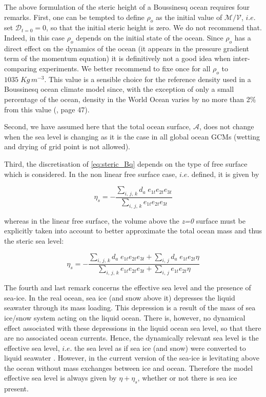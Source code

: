 \documentclass[../tex_main/NEMO_manual]{subfiles}
\begin{document}
The above formulation of the steric height of a Boussinesq ocean requires four remarks.
First, one can be tempted to define $\rho_o$ as the initial value of $\mathcal{M}/\mathcal{V}$,
$i.e.$ set $\mathcal{D}_{t=0}=0$, so that the initial steric height is zero.
We do not recommend that.
Indeed, in this case $\rho_o$ depends on the initial state of the ocean.
Since $\rho_o$ has a direct effect on the dynamics of the ocean
(it appears in the pressure gradient term of the momentum equation)
it is definitively not a good idea when inter-comparing experiments.
We better recommend to fixe once for all $\rho_o$ to $1035\;Kg\,m^{-3}$.
This value is a sensible choice for the reference density used in a Boussinesq ocean climate model since,
with the exception of only a small percentage of the ocean, density in the World Ocean varies by no more than
2$\%$ from this value (\cite{Gill1982}, page 47).

Second, we have assumed here that the total ocean surface, $\mathcal{A}$,
does not change when the sea level is changing as it is the case in all global ocean GCMs
(wetting and drying of grid point is not allowed).
  
Third, the discretisation of \autoref{eq:steric_Bq} depends on the type of free surface which is considered.
In the non linear free surface case, $i.e.$  defined, it is given by

\[ \eta_s = - \frac{ \sum_{i,\,j,\,k} d_a\; e_{1t} e_{2t} e_{3t} }
                   { \sum_{i,\,j,\,k}       e_{1t} e_{2t} e_{3t} }
 \label{eq:discrete_steric_Bq_nfs} \]

whereas in the linear free surface,
the volume above the \textit{z=0} surface must be explicitly taken into account to
better approximate the total ocean mass and thus the steric sea level:

\[	\eta_s = - \frac{ \sum_{i,\,j,\,k} d_a\; e_{1t}e_{2t}e_{3t} + \sum_{i,\,j} d_a\; e_{1t}e_{2t} \eta }
                   { \sum_{i,\,j,\,k}       e_{1t}e_{2t}e_{3t} + \sum_{i,\,j}      e_{1t}e_{2t} \eta }
 \label{eq:discrete_steric_Bq_fs} \]

The fourth and last remark concerns the effective sea level and the presence of sea-ice.
In the real ocean, sea ice (and snow above it)  depresses the liquid seawater through its mass loading.
This depression is a result of the mass of sea ice/snow system acting on the liquid ocean.
There is, however, no dynamical effect associated with these depressions in the liquid ocean sea level,
so that there are no associated ocean currents.
Hence, the dynamically relevant sea level is the effective sea level,
$i.e.$ the sea level as if sea ice (and snow) were converted to liquid seawater \citep{Campin_al_OM08}.
However, in the current version of \NEMO the sea-ice is levitating above the ocean without mass exchanges between
ice and ocean.
Therefore the model effective sea level is always given by $\eta + \eta_s$, whether or not there is sea ice present.
\end{document}
